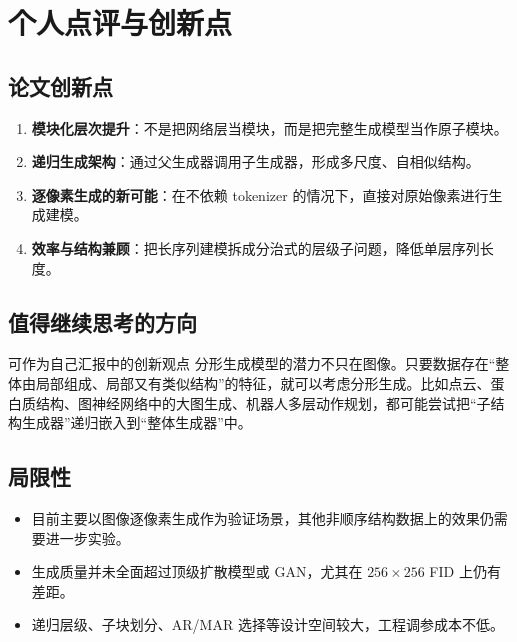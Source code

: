 \documentclass[UTF8,11pt,a4paper]{ctexart}
\newcommand{\term}[1]{\textbf{\textcolor{mainblue}{#1}}}
\begin{document}
\section{个人点评与创新点}

\subsection{论文创新点}

\begin{enumerate}
    \item \term{模块化层次提升}：不是把网络层当模块，而是把完整生成模型当作原子模块。
    \item \term{递归生成架构}：通过父生成器调用子生成器，形成多尺度、自相似结构。
    \item \term{逐像素生成的新可能}：在不依赖 tokenizer 的情况下，直接对原始像素进行生成建模。
    \item \term{效率与结构兼顾}：把长序列建模拆成分治式的层级子问题，降低单层序列长度。
\end{enumerate}

\subsection{值得继续思考的方向}

\begin{notebox}{可作为自己汇报中的创新观点}
分形生成模型的潜力不只在图像。只要数据存在“整体由局部组成、局部又有类似结构”的特征，就可以考虑分形生成。比如点云、蛋白质结构、图神经网络中的大图生成、机器人多层动作规划，都可能尝试把“子结构生成器”递归嵌入到“整体生成器”中。
\end{notebox}

\subsection{局限性}

\begin{itemize}
    \item 目前主要以图像逐像素生成作为验证场景，其他非顺序结构数据上的效果仍需要进一步实验。
    \item 生成质量并未全面超过顶级扩散模型或 GAN，尤其在 $256\times256$ FID 上仍有差距。
    \item 递归层级、子块划分、AR/MAR 选择等设计空间较大，工程调参成本不低。
\end{itemize}
\end{document}

